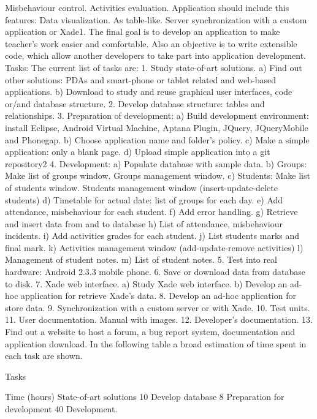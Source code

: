 Misbehaviour control.
Activities evaluation.
	Application should include this features:
Data visualization. As table-like.
Server synchronization with a custom application or Xade1.
	The final goal is to develop an application to make teacher's work easier and comfortable. Also an objective is to write extensible code, which allow another developers to take part into application development.
Tasks:
	The current list of tasks are:
 1. Study state-of-art solutions. 
 a) Find out other solutions: PDAs and smart-phone or tablet related and web-based applications.
 b) Download to study and reuse graphical user interfaces, code or/and database structure. 
 2. Develop database structure: tables and relationships. 
 3. Preparation of development:
 a) Build development environment: install Eclipse, Android Virtual Machine, Aptana Plugin, JQuery, JQueryMobile and Phonegap.
 b) Choose application name and folder's policy.
 c) Make a simple application: only a blank page.
 d) Upload simple application into a git repository2
 4. Development:
 a) Populate database with sample data.
 b) Groups:
Make list of groups window.
Groups management window.
 c) Students:
Make list of students window.
Students management window (insert-update-delete students)
 d) Timetable for actual date: list of groups for each day.
 e) Add attendance, misbehaviour for each student.
 f) Add error handling.
 g) Retrieve and insert data from and to database
 h) List of attendance, misbehaviour incidents.
 i) Add activities grades for each student.
 j) List students marks and final mark.
 k) Activities management window (add-update-remove activities)
 l) Management of student notes.
 m) List of student notes. 
 5. Test into real hardware: Android 2.3.3 mobile phone.
 6. Save or download data from database to disk.
 7. Xade web interface.
 a) Study Xade web interface.
 b) Develop an ad-hoc application for retrieve Xade's data. 
 8. Develop an ad-hoc application for store data. 
 9. Synchronization with a custom server or with Xade.
 10. Test units.
 11. User documentation. Manual with images.
 12. Developer's documentation.
 13. Find out a website to host a forum, a bug report system,  documentation and application download.
In the following table a broad estimation of time spent in each task are shown.  

Tasks
\begin{tabular}
\end{tabular}

Time  (hours)
State-of-art solutions
10
Develop database
8
Preparation for development
40
Development.

